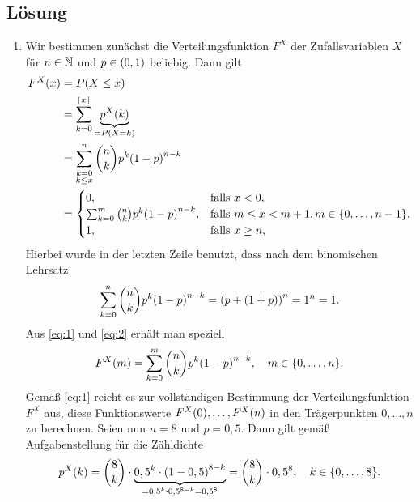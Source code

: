 \documentclass{exercise}
\begin{document}
    \subsection*{Lösung}
    \begin{enumerate}
        \item Wir bestimmen zunächst die Verteilungsfunktion \(F^X\) der Zufallsvariablen \(X\) für \(n \in \N\) und \(p \in \parentheses*{0, 1}\) beliebig.
        Dann gilt
        \begin{align}
            F^X\parentheses*{x} &= P\parentheses*{X \le x}\nonumber\\
            &= \sum_{k = 0}^{\floor*{x}}\underbrace{p^X\parentheses*{k}}_{= P\parentheses*{X = k}}\nonumber\\
            &= \sum_{\substack{k = 0\\k \le x}}^n \binom{n}{k}p^k \parentheses*{1 - p}^{n - k}\nonumber\\
            &= \begin{cases}
                0, & \text{falls }x < 0,\\
                \sum_{k = 0}^m \binom{n}{k}p^k \parentheses*{1 - p}^{n - k}, & \text{falls }m \le x < m + 1, m \in \braces*{0, \ldots, n - 1},\\
                1, & \text{falls }x \ge n,
            \end{cases}\label{eq:1}
        \end{align}
        Hierbei wurde in der letzten Zeile benutzt, dass nach dem binomischen Lehrsatz
        \begin{equation}\label{eq:2}
            \sum_{k = 0}^n \binom{n}{k}p^k\parentheses*{1 - p}^{n - k} = \parentheses*{p + \parentheses*{1 + p}}^n = 1^n = 1.
        \end{equation}
        Aus \eqref{eq:1} und \eqref{eq:2} erhält man speziell
        \begin{equation}\label{eq:3}
            F^X\parentheses*{m} = \sum_{k = 0}^m \binom{n}{k}p^k \parentheses*{1 - p}^{n - k}, \quad m \in \braces*{0, \ldots, n}.
        \end{equation}
        Gemäß \eqref{eq:1} reicht es zur vollständigen Bestimmung der Verteilungsfunktion \(F^X\) aus, diese Funktionswerte \(F^X\parentheses*{0}, \ldots, F^X\parentheses*{n}\) in den Trägerpunkten \(0, \ldots, n\) zu berechnen.
        Seien nun \(n = 8\) und \(p = 0,5\).
        Dann gilt gemäß Aufgabenstellung für die Zähldichte
        \[
            p^X\parentheses*{k} = \binom{8}{k} \cdot \underbrace{0,5^k \cdot \parentheses*{1 - 0,5}^{8 - k}}_{= 0,5^k \cdot 0,5^{8 - k} = 0,5^8} = \binom{8}{k} \cdot 0,5^8, \quad k \in \braces*{0, \ldots, 8}.
\]
\end{enumerate}
\end{document}
